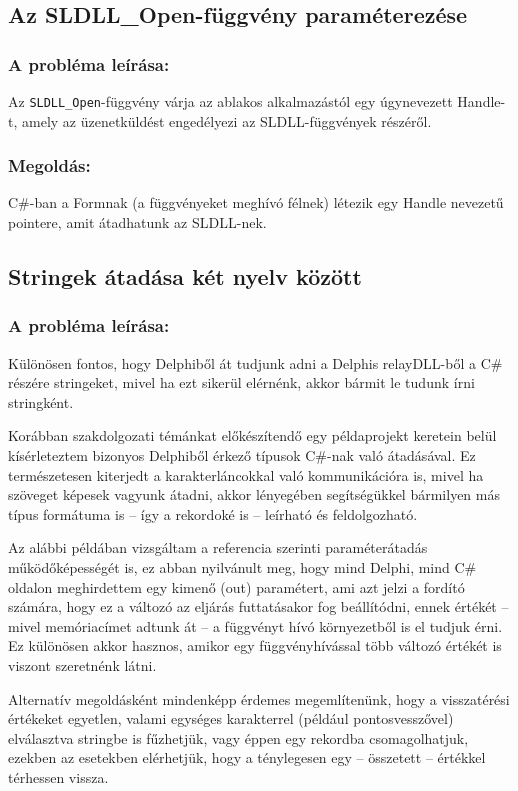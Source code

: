 \documentclass[tocnopagenum]{thesis-ekf}
\theoremstyle{definition}
\theoremstyle{remark}
\begin{document}
	\subsection{Az SLDLL\_Open-függvény paraméterezése}
	\subsubsection{A probléma leírása:} Az \verb*|SLDLL_Open|-függvény várja az ablakos alkalmazástól egy úgynevezett Handle-t, amely az üzenetküldést engedélyezi az SLDLL-függvények részéről.
	\subsubsection{Megoldás: } C\#-ban a Formnak (a függvényeket meghívó félnek) létezik egy Handle nevezetű pointere, amit átadhatunk az SLDLL-nek.
	\subsection{Stringek átadása két nyelv között}
	\subsubsection{A probléma leírása:} Különösen fontos, hogy Delphiből át tudjunk adni a Delphis relayDLL-ből a C\# részére stringeket, mivel ha ezt sikerül elérnénk, akkor bármit le tudunk írni stringként.

	Korábban szakdolgozati témánkat előkészítendő egy példaprojekt keretein belül kísérleteztem bizonyos Delphiből érkező típusok C\#-nak való átadásával. Ez természetesen kiterjedt a karakterláncokkal való kommunikációra is, mivel ha szöveget képesek vagyunk átadni, akkor lényegében segítségükkel bármilyen más típus formátuma is -- így a rekordoké is -- leírható és feldolgozható.

	Az alábbi példában vizsgáltam a referencia szerinti paraméterátadás működőképességét is, ez abban nyilvánult meg, hogy mind Delphi, mind C\# oldalon meghirdettem egy kimenő (out) paramétert, ami azt jelzi a fordító számára, hogy ez a változó az eljárás futtatásakor fog beállítódni, ennek értékét -- mivel memóriacímet adtunk át -- a függvényt hívó környezetből is el tudjuk érni. Ez különösen akkor hasznos, amikor egy függvényhívással több változó értékét is viszont szeretnénk látni.
	
	Alternatív megoldásként mindenképp érdemes megemlítenünk, hogy a visszatérési értékeket egyetlen, valami egységes karakterrel (például pontosvesszővel) elválasztva stringbe is fűzhetjük, vagy éppen egy rekordba csomagolhatjuk, ezekben az esetekben elérhetjük, hogy a ténylegesen egy -- összetett -- értékkel térhessen vissza.
	
\end{document}

